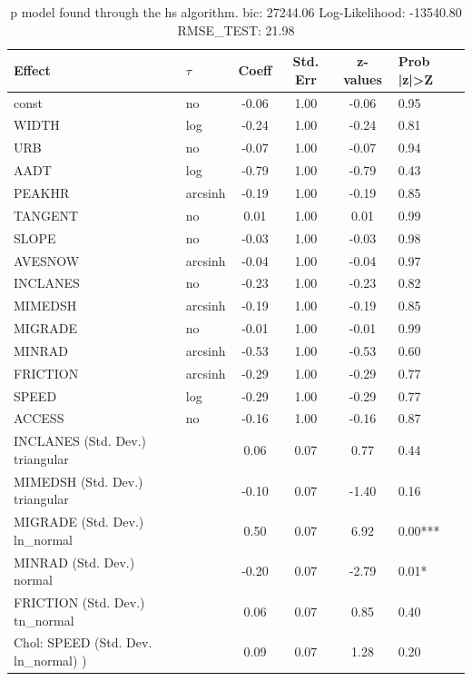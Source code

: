 \begin{table}
	\caption{p model found through the hs algorithm. bic: 27244.06 Log-Likelihood: -13540.80 RMSE_TEST: 21.98}
	\begin{center}
		\begin{tabular}{|l|l|c|c|c|l|}
			\hline
			Effect & $\tau$ & Coeff & Std. Err & z-values & Prob |z|>Z \\
			\hline
			const & no & -0.06 & 1.00 & -0.06 & 0.95 \\
			\hline
			WIDTH & log & -0.24 & 1.00 & -0.24 & 0.81 \\
			\hline
			URB & no & -0.07 & 1.00 & -0.07 & 0.94 \\
			\hline
			AADT & log & -0.79 & 1.00 & -0.79 & 0.43 \\
			\hline
			PEAKHR & arcsinh & -0.19 & 1.00 & -0.19 & 0.85 \\
			\hline
			TANGENT & no & 0.01 & 1.00 & 0.01 & 0.99 \\
			\hline
			SLOPE & no & -0.03 & 1.00 & -0.03 & 0.98 \\
			\hline
			AVESNOW & arcsinh & -0.04 & 1.00 & -0.04 & 0.97 \\
			\hline
			INCLANES & no & -0.23 & 1.00 & -0.23 & 0.82 \\
			\hline
			MIMEDSH & arcsinh & -0.19 & 1.00 & -0.19 & 0.85 \\
			\hline
			MIGRADE & no & -0.01 & 1.00 & -0.01 & 0.99 \\
			\hline
			MINRAD & arcsinh & -0.53 & 1.00 & -0.53 & 0.60 \\
			\hline
			FRICTION & arcsinh & -0.29 & 1.00 & -0.29 & 0.77 \\
			\hline
			SPEED & log & -0.29 & 1.00 & -0.29 & 0.77 \\
			\hline
			ACCESS & no & -0.16 & 1.00 & -0.16 & 0.87 \\
			\hline
			INCLANES (Std. Dev.) triangular &  & 0.06 & 0.07 & 0.77 & 0.44 \\
			\hline
			MIMEDSH (Std. Dev.) triangular &  & -0.10 & 0.07 & -1.40 & 0.16 \\
			\hline
			MIGRADE (Std. Dev.) ln_normal &  & 0.50 & 0.07 & 6.92 & 0.00*** \\
			\hline
			MINRAD (Std. Dev.) normal &  & -0.20 & 0.07 & -2.79 & 0.01* \\
			\hline
			FRICTION (Std. Dev.) tn_normal &  & 0.06 & 0.07 & 0.85 & 0.40 \\
			\hline
			 Chol: SPEED (Std. Dev. ln_normal) ) &  & 0.09 & 0.07 & 1.28 & 0.20 \\

\end{tabular}
\end{center}
\end{table}
